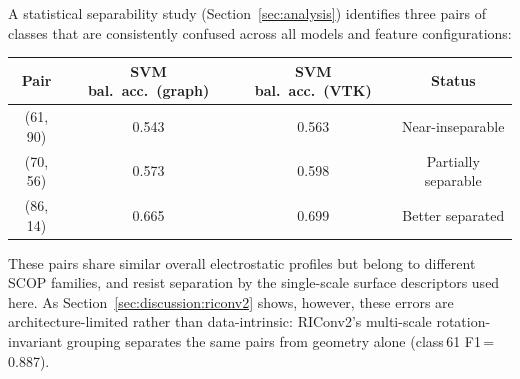 A statistical separability study (Section~\ref{sec:analysis}) identifies three
pairs of classes that are consistently confused across all models and feature
configurations:

\begin{center}
  \begin{tabular}{cccc}
    \toprule
    \textbf{Pair} & \textbf{SVM bal.\ acc.\ (graph)} & \textbf{SVM bal.\ acc.\ (VTK)} & \textbf{Status} \\
    \midrule
    (61, 90) & 0.543 & 0.563 & Near-inseparable \\
    (70, 56) & 0.573 & 0.598 & Partially separable \\
    (86, 14) & 0.665 & 0.699 & Better separated \\
    \bottomrule
  \end{tabular}
\end{center}

These pairs share similar overall electrostatic profiles but belong to
different SCOP families, and resist separation by the single-scale surface
descriptors used here. As Section~\ref{sec:discussion:riconv2} shows, however,
these errors are architecture-limited rather than data-intrinsic: RIConv2's
multi-scale rotation-invariant grouping separates the same pairs from geometry
alone (class\,61 F1\,=\,0.887).

